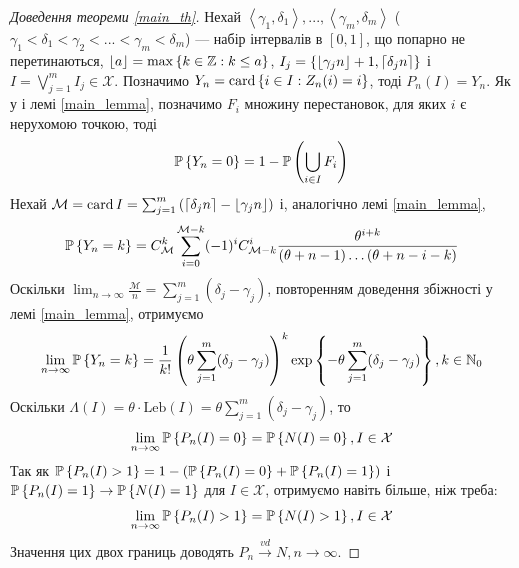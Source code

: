 \begin{proof}[Доведення теореми \ref{main_th}]\label{main_proof}
    Нехай $\left<\gamma_1, \delta_1 \right>, ..., \left<\gamma_m, \delta_m \right>$ 
    ($\gamma_1 < \delta_1 < \gamma_2 < ... < \gamma_m < \delta_m$) --- 
    набір інтервалів в $[0, 1]$, що попарно не перетинаються, 
    $\floor*{a} = \max\left\{k\in\Z : k \leq a\right\}$,
    $I_j = \left\{ 
        \floor*{\gamma_j n} + 1, 
        \ceil*{\delta_j n}
    \right\}$ і $I = \bigvee_{j=1}^m I_j \in \mathcal{X}$.
    Позначимо $Y_n = \card\left\{i \in I : Z_n(i) = i\right\}$,
    тоді $P_n (I) = Y_n$.
    Як у і лемі \ref{main_lemma},
    позначимо $F_i$ множину перестановок, для яких $i$ є нерухомою точкою, тоді
    \begin{gather*}
        \P{Y_n = 0} = 1 -
        \mathbb{P}\left(\bigcup_{i \in I} F_i \right)
    \end{gather*}
    Нехай $\mathcal{M} = \card {I} = \sum_{j=1}^m \left(
        \ceil*{\delta_j n} - \floor*{\gamma_j n}
    \right)$ і, аналогічно лемі \ref{main_lemma},
    \begin{gather*}
        \P{Y_n = k} = C_{\mathcal{M}}^k \sum_{i=0}^{\mathcal{M}-k}(-1)^{i} C_{\mathcal{M}-k}^{i} \frac{\theta^{i+k}}{
            (\theta + n - 1) \dots (\theta + n - i - k)
        }
    \end{gather*}
    Оскільки $\lim_{n\to\infty}\frac{\mathcal{M}}{n} = \sum_{j=1}^m (\delta_j - \gamma_j)$,
    повторенням доведення збіжності у лемі \ref{main_lemma},
    отримуємо
    \begin{gather*}
            \lim_{n\to\infty}\P{Y_n = k} = 
            \frac{1}{k!} \left(
                \theta \sum_{j=1}^m (\delta_j - \gamma_j)
            \right)^k
            \exp\left\{ 
                -\theta \sum_{j=1}^m (\delta_j - \gamma_j)
            \right\}, k \in \N_0
    \end{gather*}
    Оскільки $\Lambda(I) = \theta \cdot \mathrm{Leb}(I) = \theta \sum_{j=1}^m (\delta_j - \gamma_j)$,
    то
    \begin{gather*}
        \lim_{n\to\infty}\P{P_n(I) = 0} = \P{N(I) = 0}, I\in\mathcal{X}
    \end{gather*}
    Так як $\P{P_n(I) > 1} = 1 - \left(
        \P{P_n(I) = 0} + \P{P_n(I) = 1}
    \right)$ і $\P{P_n(I) = 1} \to \P{N(I) = 1}$ для $I\in\mathcal{X}$,
    отримуємо навіть більше, ніж треба:
    \begin{gather*}
        \lim_{n\to\infty}\P{P_n(I) > 1} = \P{N(I) > 1}, I\in\mathcal{X}
    \end{gather*}
    Значення цих двох границь доводять
    $P_n \overset{vd}{\longrightarrow} N, n\to\infty$.
\end{proof}

